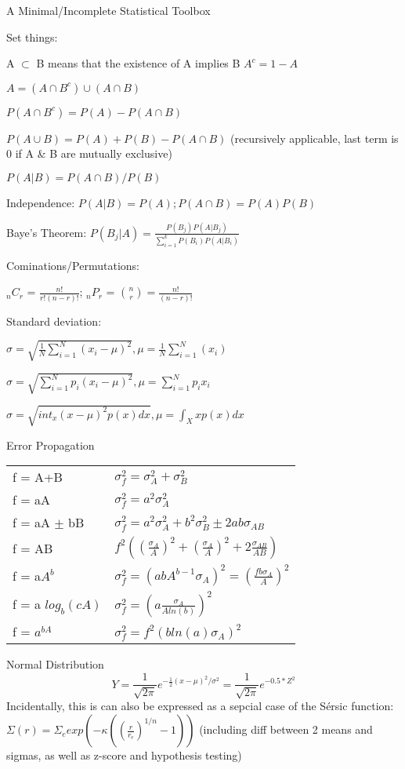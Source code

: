 \documentclass{slides}
\begin{document}
A Minimal/Incomplete Statistical Toolbox

Set things:

A $\subset$ B means that the existence of A implies B
$A^c = 1 - A$

$A = (A \cap B^c) \cup (A \cap B)$

$P(A \cap B^c) = P(A) - P(A \cap B)$

$P(A \cup B) = P(A) + P(B) - P(A \cap B)$ (recursively applicable, last term is 0 if A \& B are mutually exclusive)

$P(A|B)=P(A \cap B)/P(B)$

Independence: $P(A|B) = P(A); P(A \cap B) = P(A) P(B)$

Baye's Theorem: $P(B_j|A) = \frac{P(B_j) P(A|B_j)}{\sum_{i=1}^{k} P(B_i) P(A|B_i)}$


\newpage
Cominations/Permutations:

$_nC_r$ = $\frac{n!}{r!(n-r)!}$; $_nP_r$ = $\binom{n}{r} = \frac{n!}{(n-r)!}$

Standard deviation:

$\sigma = \sqrt{\frac{1}{N}\sum_{i=1}^{N} (x_i - \mu)^2}, \mu = \frac{1}{N}\sum_{i=1}^{N}(x_i)$

$\sigma = \sqrt{\sum_{i=1}^{N} p_i (x_i -\mu)^2}, \mu = \sum_{i=1}^{N} p_i x_i$

$\sigma = \sqrt{int_{x} (x - \mu)^2p(x)dx}, \mu = \int_{X} x p(x)dx$

\newpage
Error Propagation

\begin{tabular}{l l}
 f = A+B & $\sigma^2_f = \sigma^2_A + \sigma^2_B$ \\
 f = aA & $\sigma^2_f = a^2\sigma^2_A$ \\
 f = aA $\pm$ bB & $\sigma_f^2 = a^2\sigma_A^2 + b^2\sigma_B^2 \pm 2ab\sigma_{AB}$ \\
 f = AB & $f^2 ((\frac{\sigma_A}{A})^2 + (\frac{\sigma_A}{A})^2 + 2\frac{\sigma_{AB}}{AB})$ \\ 
 f = a$A^b$ & $\sigma_f^2 = (abA^{b-1}\sigma_A)^2 = (\frac{fb\sigma_A}{A})^2$ \\
 f = a $log_b(cA)$ & $\sigma_f^2 = (a\frac{\sigma_A}{A ln(b)})^2$ \\
 f = $a^{bA}$ & $\sigma^2_f = f^2(b ln(a)\sigma_A)^2$ \\
\end{tabular}

\newpage
Normal Distribution
\[
Y = \frac{1}{\sqrt{2\pi}} e^{-\frac{1}{2}(x-\mu)^2/\sigma^2} = \frac{1}{\sqrt{2\pi}} e^{-0.5*Z^2} 
\]
Incidentally, this is can also be expressed as a sepcial case of the S\'ersic function: $\Sigma(r) = \Sigma_e exp(-\kappa((\frac{r}{r_e})^{1/n}-1))$
(including diff between 2 means and sigmas, as well as z-score and hypothesis testing)
\end{document}
